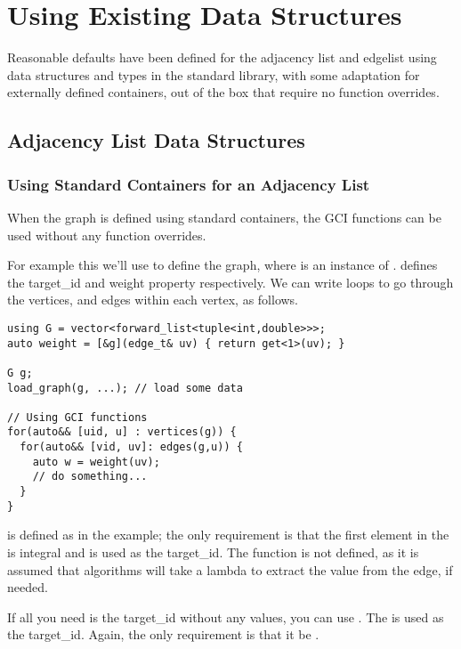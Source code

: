 \section{Using Existing Data Structures}
Reasonable defaults have been defined for the adjacency list and edgelist using data structures and types
in the standard library, with some adaptation for externally defined containers, out of the box that require
no function overrides.

\subsection{Adjacency List Data Structures}

\subsubsection{Using Standard Containers for an Adjacency List}
When the graph is defined using standard containers, the GCI functions can be used without any function overrides.

For example this we'll use  to define the graph, where  
is an instance of .  defines the target\_id and weight property respectively. We
can write loops to go through the vertices, and edges within each vertex, as follows.

\begin{lstlisting}
using G = vector<forward_list<tuple<int,double>>>;
auto weight = [&g](edge_t& uv) { return get<1>(uv); }

G g;
load_graph(g, ...); // load some data

// Using GCI functions
for(auto&& [uid, u] : vertices(g)) {
  for(auto&& [vid, uv]: edges(g,u)) {
    auto w = weight(uv);
    // do something...
  }
}
\end{lstlisting}

 is defined as  in the example; the only requirement is that the first element
in the  is integral and is used as the target\_id. The  function is not defined, as it is
assumed that algorithms will take a lambda to extract the value from the edge, if needed.

If all you need is the target\_id without any values, you can use . The 
is used as the target\_id. Again, the only requirement is that it be .

